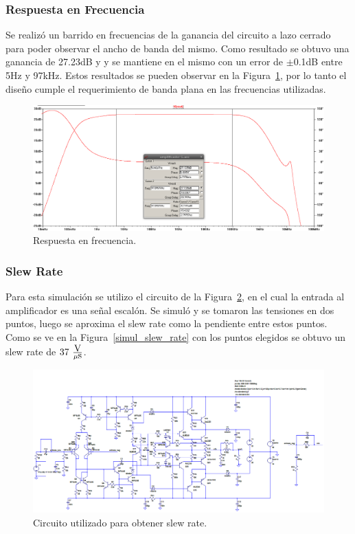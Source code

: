 \subsubsection{Respuesta en Frecuencia}

Se realizó un barrido en frecuencias de la ganancia del circuito a lazo cerrado para poder observar el ancho de banda del mismo. Como resultado se obtuvo una ganancia de 27.23dB y y se mantiene en el mismo con un error de $\pm$0.1dB entre 5Hz y 97kHz.
Estos resultados se pueden observar en la Figura~\ref{resp_frec}, por lo tanto el diseño cumple el requerimiento de banda plana en las frecuencias utilizadas. 

\begin{figure}[H]
\centering
\centerline{
\includegraphics[width=\textwidth]{img/ancho_de_banda.png}}
\caption{Respuesta en frecuencia.}
\label{resp_frec} 
\end{figure}

\bigskip
\subsubsection{Slew Rate}

Para esta simulación se utilizo el circuito de la Figura~\ref{cir_simul_slew_rate}, en el cual la entrada al amplificador es una señal escalón. Se simuló y se tomaron las tensiones en dos puntos, luego se aproxima el slew rate como la pendiente entre estos puntos. Como se ve en la Figura~\ref{simul_slew_rate} con los puntos elegidos se obtuvo un slew rate de $37~ \frac{\mbox{V}}{\mu\mbox{s}}$.

\begin{figure}[H]
\centering
\includegraphics[width=1\textwidth]{img/slew_rate_cir.png}
\caption{Circuito utilizado para obtener slew rate.}
\label{cir_simul_slew_rate}
\end{figure}

